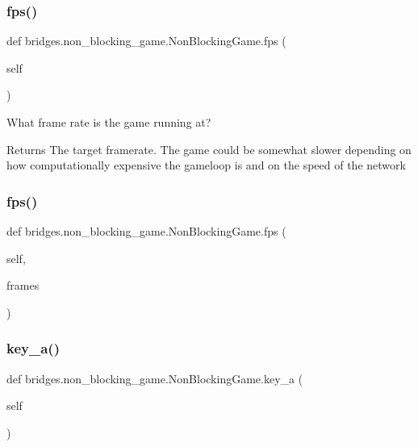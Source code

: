 \subsubsection{\texorpdfstring{fps()}{fps()}\hspace{0.1cm}{\footnotesize\ttfamily [1/2]}}
{\footnotesize\ttfamily def bridges.\+non\+\_\+blocking\+\_\+game.\+Non\+Blocking\+Game.\+fps (\begin{DoxyParamCaption}\item[{}]{self }\end{DoxyParamCaption})}



What frame rate is the game running at? 

\begin{DoxyReturn}{Returns}
The target framerate. The game could be somewhat slower depending on how computationally expensive the gameloop is and on the speed of the network 
\end{DoxyReturn}
\mbox{\label{classbridges_1_1non__blocking__game_1_1_non_blocking_game_a46b4b4a25c7c7ffc78126a7b693b7ceb}} 
\subsubsection{\texorpdfstring{fps()}{fps()}\hspace{0.1cm}{\footnotesize\ttfamily [2/2]}}
{\footnotesize\ttfamily def bridges.\+non\+\_\+blocking\+\_\+game.\+Non\+Blocking\+Game.\+fps (\begin{DoxyParamCaption}\item[{}]{self,  }\item[{}]{frames }\end{DoxyParamCaption})}

\mbox{\label{classbridges_1_1non__blocking__game_1_1_non_blocking_game_a7076d0ff62aeba49a0caf71e213361db}} 
\subsubsection{\texorpdfstring{key\_a()}{key\_a()}}
{\footnotesize\ttfamily def bridges.\+non\+\_\+blocking\+\_\+game.\+Non\+Blocking\+Game.\+key\+\_\+a (\begin{DoxyParamCaption}\item[{}]{self }\end{DoxyParamCaption})}



